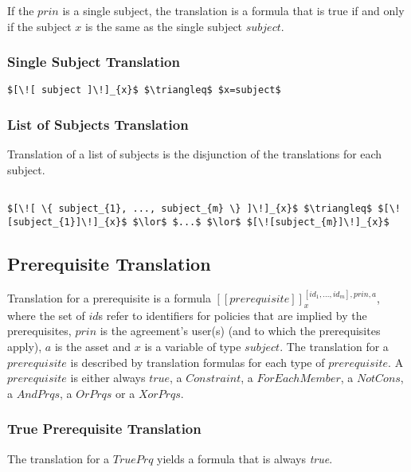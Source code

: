If the $prin$ is a single subject, the translation is a formula that is true if and only if the subject $x$ is the same as the single subject $subject$.

\subsubsection{Single Subject Translation}
\lstset{mathescape, language=AST}  
\begin{lstlisting}[frame=single, caption={Prin Translation {$\colon$} Single subject},label={lst:transprinSingle}]
$[\![ subject ]\!]_{x}$ $\triangleq$ $x=subject$
\end{lstlisting}

\subsubsection{List of Subjects Translation}
Translation of a list of subjects is the disjunction of the translations for each subject.

\lstset{mathescape, language=AST}  
\begin{lstlisting}[frame=single, caption={Prin Translation {$\colon$} List of subjects},label={lst:transprinListOfSubjects}]

$[\![ \{ subject_{1}, ..., subject_{m} \} ]\!]_{x}$ $\triangleq$ $[\![subject_{1}]\!]_{x}$ $\lor$ $...$ $\lor$ $[\![subject_{m}]\!]_{x}$

\end{lstlisting}




\subsection{Prerequisite Translation}

Translation for a prerequisite is a formula $[\![prerequisite]\!]^{[id_{1}, ..., id_{m}], prin, a}_{x}$, where the set of $id$s refer to identifiers for policies that are implied by the prerequisites, $prin$ is the agreement's user(s) (and to which the prerequisites apply), $a$ is the asset and $x$ is a variable of type $subject$. The translation for a $prerequisite$ is described by translation formulas for each type of $prerequisite$. A $prerequisite$ is either always $true$, a $Constraint$, a $ForEachMember$, a $NotCons$, a $AndPrqs$, a $OrPrqs$ or a $XorPrqs$.

\subsubsection{True Prerequisite Translation}
The translation for a $TruePrq$ yields a formula that is always \emph{true}.

